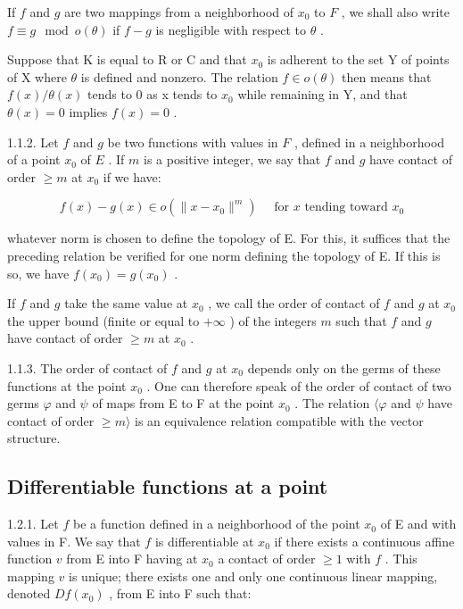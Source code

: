 If \(f\) and \(g\) are two mappings from a neighborhood of \(x_{0}\) to \(F\) , we shall also write \(f \equiv g \mod o(\theta)\) if \(f - g\) is negligible with respect to \(\theta\) .

Suppose that K is equal to R or C and that \(x_{0}\) is adherent to the set Y of points of X where \(\theta\) is defined and nonzero. The relation \(f \in o(\theta)\) then means that \(f(x)/\theta(x)\) tends to 0 as x tends to \(x_{0}\) while remaining in Y, and that \(\theta(x) = 0\) implies \(f(x) = 0\) .

1.1.2. Let \(f\) and \(g\) be two functions with values in \(F\) , defined in a neighborhood of a point \(x_0\) of \(E\) . If \(m\) is a positive integer, we say that \(f\) and \(g\) have contact of order \(\geqslant m\) at \(x_0\) if we have:

\[
f (x) - g (x) \in o (\| x - x _ {0} \| ^ {m}) \quad \text { for } x \text { tending   toward } x _ {0}
\]

whatever norm is chosen to define the topology of E. For this, it suffices that the preceding relation be verified for one norm defining the topology of E. If this is so, we have \(f(x_0) = g(x_0)\) .

If \(f\) and \(g\) take the same value at \(x_{0}\) , we call the order of contact of \(f\) and \(g\) at \(x_{0}\) the upper bound (finite or equal to \(+\infty\) ) of the integers \(m\) such that \(f\) and \(g\) have contact of order \(\geqslant m\) at \(x_{0}\) .

1.1.3. The order of contact of \(f\) and \(g\) at \(x_{0}\) depends only on the germs of these functions at the point \(x_{0}\) . One can therefore speak of the order of contact of two germs \(\varphi\) and \(\psi\) of maps from E to F at the point \(x_{0}\) . The relation \(\langle\varphi\) and \(\psi\) have contact of order \(\geqslant m\rangle\) is an equivalence relation compatible with the vector structure.

\subsection{Differentiable functions at a point}

1.2.1. Let \(f\) be a function defined in a neighborhood of the point \(x_{0}\) of E and with values in F. We say that \(f\) is differentiable at \(x_{0}\) if there exists a continuous affine function \(v\) from E into F having at \(x_{0}\) a contact of order \(\geqslant 1\) with \(f\) . This mapping \(v\) is unique; there exists one and only one continuous linear mapping, denoted \(Df(x_{0})\) , from E into F such that:

